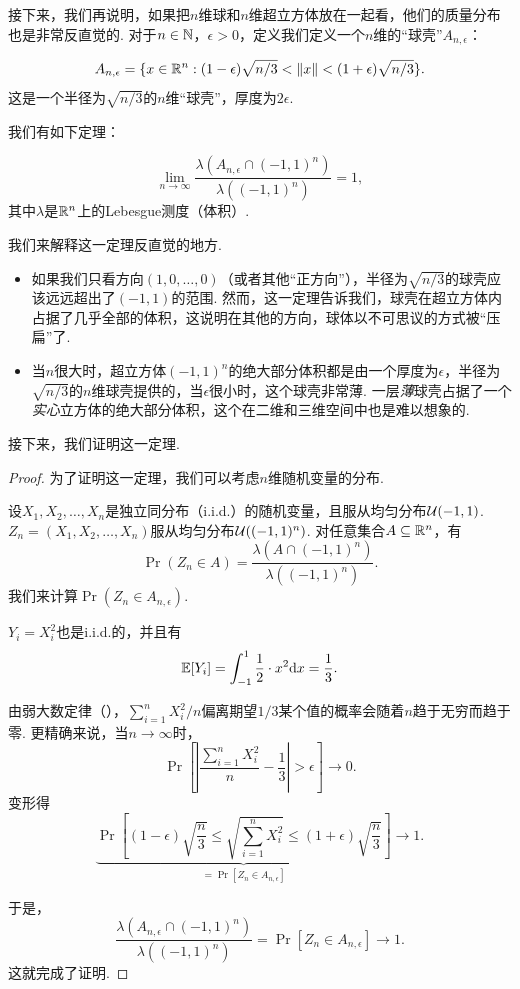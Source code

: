 接下来，我们再说明，如果把$n$维球和$n$维超立方体放在一起看，他们的质量分布也是非常反直觉的. 对于$n \in \mathbb{N}$，$\epsilon>0$，定义我们定义一个$n$维的“球壳”$A_{n,\epsilon}$：

\[A_{n,\epsilon} = \{x \in \mathbb{R}^n:(1-\epsilon)\sqrt{n/3}<\left\|x\right\|<(1+\epsilon)\sqrt{n/3}\}.\]
这是一个半径为$\sqrt{n/3}$的$n$维“球壳”，厚度为$2\epsilon$. 

我们有如下定理：
\begin{theorem}
\[\lim_{n\to \infty} \frac{\lambda (A_{n,\epsilon}\cap (-1,1)^n)}{\lambda((-1,1)^n)} = 1,\]
其中$\lambda$是$\mathbb{R}^n$上的Lebesgue测度（体积）. 
\end{theorem}

我们来解释这一定理反直觉的地方. 
\begin{itemize}
    \item 如果我们只看方向$(1,0,\dots,0)$（或者其他“正方向”），半径为$\sqrt{n/3}$的球壳应该远远超出了$(-1,1)$的范围. 然而，这一定理告诉我们，球壳在超立方体内占据了几乎全部的体积，这说明在其他的方向，球体以不可思议的方式被“压扁”了. 
    \item 当$n$很大时，超立方体$(-1,1)^n$的绝大部分体积都是由一个厚度为$\epsilon$，半径为$\sqrt{n/3}$的$n$维球壳提供的，当$\epsilon$很小时，这个球壳非常薄. 一层\textit{薄}球壳占据了一个\textit{实心}立方体的绝大部分体积，这个在二维和三维空间中也是难以想象的. 
\end{itemize}

接下来，我们证明这一定理. 
\begin{proof}

为了证明这一定理，我们可以考虑$n$维随机变量的分布. 

设$X_1, X_2, \dots, X_n$是独立同分布（i.i.d.）的随机变量，且服从均匀分布$\mathcal{U}(-1,1)$. $Z_n=(X_1,X_2,\dots,X_n)$服从均匀分布$\mathcal{U}((-1,1)^n)$. 对任意集合$A\subseteq \mathbb{R}^n$，有
\[\Pr(Z_n\in A) = \frac{\lambda(A\cap (-1,1)^n)}{\lambda((-1,1)^n)}.\]
我们来计算$\Pr(Z_n\in A_{n,\epsilon})$. 

$Y_i=X_i^2$也是i.i.d.的，并且有\[\mathbb{E}[Y_i] = \int_{-1}^1 \frac{1}{2}\cdot x^2 \mathrm{d} x = \frac{1}{3}.\]

由弱大数定律（），$\sum_{i=1}^n X_i^2/n$偏离期望$1/3$某个值的概率会随着$n$趋于无穷而趋于零. 更精确来说，当$n\to \infty$时，
\[
\Pr\left[\left|\frac{\sum_{i=1}^n X_i^2}{n}-\frac{1}{3}\right|>\epsilon\right]\to 0.
\]
变形得
\[
\underbrace{\Pr\left[(1-\epsilon)\sqrt{\frac{n}{3}}\leq \sqrt{\sum_{i=1}^nX_i^2}\leq (1+\epsilon)\sqrt{\frac{n}{3}}\right]}_{=\Pr\left[Z_n \in A_{n,\epsilon}\right]}\to 1.
\]

于是，
\[
\frac{\lambda (A_{n,\epsilon}\cap (-1,1)^n)}{\lambda((-1,1)^n)}=\Pr\left[Z_n \in A_{n,\epsilon}\right]\to 1.
\]
这就完成了证明. 
\end{proof}

